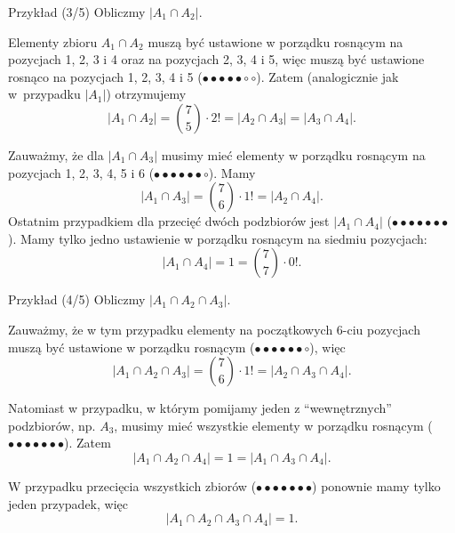 \documentclass[a4paper,10pt]{beamer}
\begin{document}
\begin{frame}

\begin{exampleblock}{Przykład (3/5)}
Obliczmy $|A_1\cap A_2|$.

Elementy zbioru $A_1\cap A_2$ muszą być ustawione w porządku rosnącym na pozycjach 1, 2, 3 i 4 oraz na pozycjach 2, 3, 4 i 5, więc muszą być ustawione rosnąco na pozycjach 1, 2, 3, 4 i 5 ($\bullet\bullet\bullet\bullet\bullet\circ\circ$). Zatem (analogicznie jak w~przypadku $|A_1|$) otrzymujemy
$$|A_1\cap A_2|={7\choose5}\cdot2!=|A_2\cap A_3|=|A_3\cap A_4|.$$

Zauważmy, że dla $|A_1\cap A_3|$ musimy mieć elementy w porządku rosnącym na pozycjach 1, 2, 3, 4, 5 i 6 ($\bullet\bullet\bullet\bullet\bullet\bullet\circ$). Mamy
$$|A_1\cap A_3|={7\choose6}\cdot1!=|A_2\cap A_4|.$$
Ostatnim przypadkiem dla przecięć dwóch podzbiorów jest $|A_1\cap A_4|$ ($\bullet\bullet\bullet\bullet\bullet\bullet\bullet$). Mamy tylko jedno ustawienie w porządku rosnącym na siedmiu pozycjach:
$$|A_1\cap A_4|=1={7\choose7}\cdot0!.$$
\end{exampleblock}

\end{frame}





\begin{frame}

\begin{exampleblock}{Przykład (4/5)}
Obliczmy $|A_1\cap A_2\cap A_3|$.

Zauważmy, że w tym przypadku elementy na początkowych 6-ciu pozycjach muszą być ustawione w porządku rosnącym ($\bullet\bullet\bullet\bullet\bullet\bullet\circ$), więc
$$|A_1\cap A_2\cap A_3|={7\choose6}\cdot1!=|A_2\cap A_3\cap A_4|.$$

Natomiast w przypadku, w którym pomijamy jeden z ``wewnętrznych'' podzbiorów, np. $A_3$, musimy mieć wszystkie elementy w porządku rosnącym ($\bullet\bullet\bullet\bullet\bullet\bullet\bullet$). Zatem
$$|A_1\cap A_2\cap A_4|=1=|A_1\cap A_3\cap A_4|.$$

W przypadku przecięcia wszystkich zbiorów ($\bullet\bullet\bullet\bullet\bullet\bullet\bullet$) ponownie mamy tylko jeden przypadek, więc $$|A_1\cap A_2\cap A_3\cap A_4|=1.$$
\end{exampleblock}

\end{frame}
\end{document}
